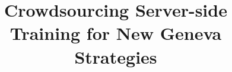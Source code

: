 \documentclass[sigconf,anonymous]{acmart}
\begin{document}

\newcommand{\name}{$\mathsf{SystemName}$\xspace} %
\newcommand{\Name}{$\mathsf{SystemName}$\xspace} %



\title{Crowdsourcing Server-side Training for New Geneva Strategies}




% 

\maketitle


\begin{intro}

\end{intro}
% 
% 
\begin{methodology}

\end{methodology}
% 
% 
\begin{challenges}

\end{challenges}



\end{document}
